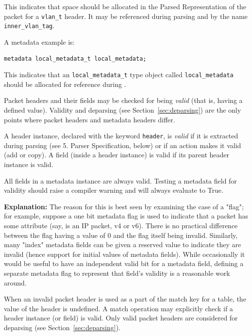 \documentclass[12pt]{article}
\begin{document}
This indicates that space should be allocated in the Parsed
Representation of the packet for a \texttt{vlan_t} header. It may be
referenced during parsing and \matchaction by the name
\texttt{inner_vlan_tag}.

A metadata example is:

\begin{lstlisting}[keywords={},frame=single,escapechar=\@]
metadata local_metadata_t local_metadata;
\end{lstlisting}

This indicates that an \texttt{local_metadata_t} type object called
\texttt{local_metadata} should be allocated for reference during
\matchaction.  


Packet headers and their fields may be checked for being
\textit{valid} (that is, having a defined value). Validity and
deparsing (see Section~\ref{sec:deparsing}) are the only points where packet
headers and metadata headers differ.

A header instance, declared with the keyword \texttt{header}, is
\textit{valid} if it is extracted during parsing (see 5. Parser
Specification, below) or if an action makes it valid (add or copy). A
field (inside a header instance) is valid if its parent header
instance is valid.

All fields in a metadata instance are always valid.  Testing a
metadata field for validity should raise a compiler warning and will
always evaluate to True.

\begin{adjustwidth}{1.5cm}{1.5cm}
\textbf{Explanation: } The reason for this is best seen by examining
the case of a "flag"; for example, suppose a one bit metadata flag is
used to indicate that a packet has some attribute (say, is an IP
packet, v4 or v6).  There is no practical difference between the flag
having a value of 0 and the flag itself being invalid.  Similarly,
many "index" metadata fields can be given a reserved value to indicate
they are invalid (hence support for initial values of metadata
fields).  While occasionally it would be useful to have an independent
valid bit for a metadata field, defining a separate metadata flag to
represent that field's validity is a reasonable work around.
\end{adjustwidth}

When an invalid packet header is used as a part of the match key for a table,
the value of the header is undefined.
A match operation may explicitly check if a header
instance (or field) is valid. Only valid packet headers are considered
for deparsing (see Section~\ref{sec:deparsing}).
\end{document}
